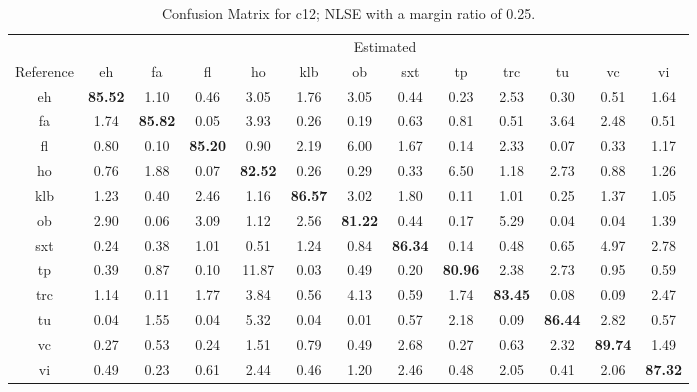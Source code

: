 \begin{landscape}
\begin{table*} %
\begin{center}
\caption{Confusion Matrix for c12; NLSE with a margin ratio of 0.25.}
\begin{tabular}{c | cccccccccccc}
\hline      %
 & \multicolumn{12}{c}{Estimated}\\
 Reference  & eh &    fa &   fl &    ho &   klb &    ob &   sxt &    tp &   trc &    tu &    vc &    vi \\
\hline
eh & \textbf{85.52} &  1.10 &  0.46 &  3.05 &  1.76 &  3.05 &  0.44 &  0.23 &  2.53 &  0.30 &  0.51 &  1.64 \\
fa &   1.74 & \textbf{85.82} &  0.05 &  3.93 &  0.26 &  0.19 &  0.63 &  0.81 &  0.51 &  3.64 &  2.48 &  0.51 \\
fl &   0.80 &  0.10 & \textbf{85.20} &  0.90 &  2.19 &  6.00 &  1.67 &  0.14 &  2.33 &  0.07 &  0.33 &  1.17 \\
ho &   0.76 &  1.88 &  0.07 & \textbf{82.52} &  0.26 &  0.29 &  0.33 &  6.50 &  1.18 &  2.73 &  0.88 &  1.26 \\
klb &   1.23 &  0.40 &  2.46 &  1.16 & \textbf{86.57} &  3.02 &  1.80 &  0.11 &  1.01 &  0.25 &  1.37 &  1.05 \\
ob &   2.90 &  0.06 &  3.09 &  1.12 &  2.56 & \textbf{81.22} &  0.44 &  0.17 &  5.29 &  0.04 &  0.04 &  1.39 \\
sxt &   0.24 &  0.38 &  1.01 &  0.51 &  1.24 &  0.84 & \textbf{86.34} &  0.14 &  0.48 &  0.65 &  4.97 &  2.78 \\
tp &   0.39 &  0.87 &  0.10 & 11.87 &  0.03 &  0.49 &  0.20 & \textbf{80.96} &  2.38 &  2.73 &  0.95 &  0.59 \\
trc &   1.14 &  0.11 &  1.77 &  3.84 &  0.56 &  4.13 &  0.59 &  1.74 & \textbf{83.45} &  0.08 &  0.09 &  2.47 \\
tu &   0.04 &  1.55 &  0.04 &  5.32 &  0.04 &  0.01 &  0.57 &  2.18 &  0.09 & \textbf{86.44} &  2.82 &  0.57 \\
vc &   0.27 &  0.53 &  0.24 &  1.51 &  0.79 &  0.49 &  2.68 &  0.27 &  0.63 &  2.32 & \textbf{89.74} &  1.49 \\
vi &   0.49 &  0.23 &  0.61 &  2.44 &  0.46 &  1.20 &  2.46 &  0.48 &  2.05 &  0.41 &  2.06 & \textbf{87.32} \\
\hline
\end{tabular}
\label{tab:confmat_nlse}
\end{center}
\end{table*}
\end{landscape}


